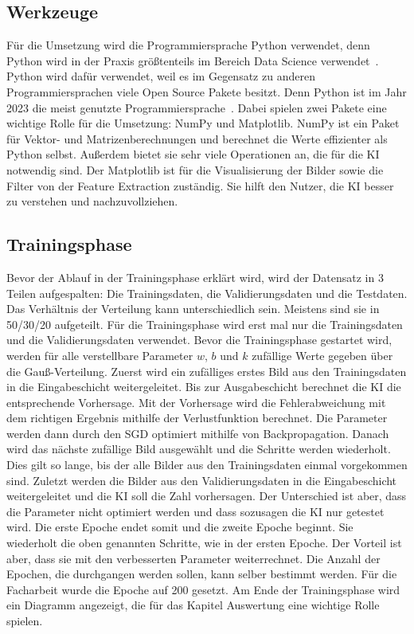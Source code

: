 \documentclass[11pt]{article}
\begin{document}
\subsection{Werkzeuge}
Für die Umsetzung wird die Programmiersprache Python verwendet, denn Python wird in der Praxis größtenteils im Bereich Data Science verwendet~\cite{20}.
Python wird dafür verwendet, weil es im Gegensatz zu anderen Programmiersprachen viele Open Source Pakete besitzt.
Denn Python ist im Jahr 2023 die meist genutzte Programmiersprache~\cite{21}. Dabei spielen zwei Pakete eine wichtige Rolle für die Umsetzung:
NumPy und Matplotlib. NumPy ist ein Paket für Vektor- und Matrizenberechnungen und berechnet die Werte effizienter als Python selbst. Außerdem
bietet sie sehr viele Operationen an, die für die KI notwendig sind. Der Matplotlib ist für die Visualisierung der Bilder sowie die Filter von der
Feature Extraction zuständig. Sie hilft den Nutzer, die KI besser zu verstehen und nachzuvollziehen.

\subsection{Trainingsphase}
Bevor der Ablauf in der Trainingsphase erklärt wird, wird der Datensatz in 3 Teilen aufgespalten: Die Trainingsdaten, die Validierungsdaten
und die Testdaten. Das Verhältnis der Verteilung kann unterschiedlich sein. Meistens sind sie in 50/30/20 aufgeteilt.
Für die Trainingsphase wird erst mal nur die Trainingsdaten und die Validierungsdaten verwendet.
Bevor die Trainingsphase gestartet wird, werden für alle verstellbare Parameter $w$, $b$ und $k$ zufällige Werte gegeben über
die Gauß-Verteilung. Zuerst wird ein zufälliges erstes Bild aus den Trainingsdaten in die Eingabeschicht weitergeleitet.
Bis zur Ausgabeschicht berechnet die KI die entsprechende Vorhersage. Mit der Vorhersage wird die Fehlerabweichung mit dem richtigen
Ergebnis mithilfe der Verlustfunktion berechnet. Die Parameter werden dann durch den SGD optimiert mithilfe von Backpropagation.
Danach wird das nächste zufällige Bild ausgewählt und die Schritte werden wiederholt. Dies gilt so lange, bis der alle Bilder aus
den Trainingsdaten einmal vorgekommen sind. Zuletzt werden die Bilder aus den Validierungsdaten
in die Eingabeschicht weitergeleitet und die KI soll die Zahl vorhersagen. Der Unterschied ist aber, dass die Parameter nicht optimiert werden
und dass sozusagen die KI nur getestet wird. Die erste Epoche endet somit und die zweite Epoche beginnt. Sie wiederholt die oben genannten Schritte,
wie in der ersten Epoche. Der Vorteil ist aber, dass sie mit den verbesserten Parameter weiterrechnet. Die Anzahl der Epochen, die durchgangen
werden sollen, kann selber bestimmt werden. Für die Facharbeit wurde die Epoche auf 200 gesetzt. Am Ende der Trainingsphase wird ein Diagramm
angezeigt, die für das Kapitel Auswertung eine wichtige Rolle spielen.
\end{document}
